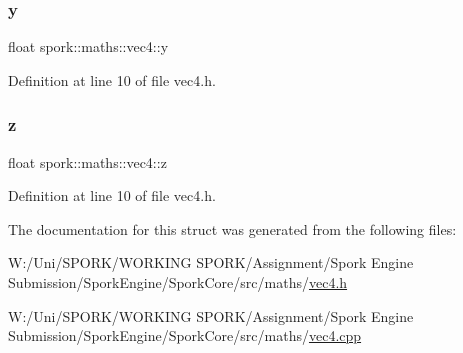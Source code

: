 \subsubsection{\texorpdfstring{y}{y}}
{\footnotesize\ttfamily float spork\+::maths\+::vec4\+::y}



Definition at line 10 of file vec4.\+h.

\mbox{\label{structspork_1_1maths_1_1vec4_ab9786e1d7ec46d476a97d29330d568fe}} 
\subsubsection{\texorpdfstring{z}{z}}
{\footnotesize\ttfamily float spork\+::maths\+::vec4\+::z}



Definition at line 10 of file vec4.\+h.



The documentation for this struct was generated from the following files\+:\begin{DoxyCompactItemize}
\item 
W\+:/\+Uni/\+S\+P\+O\+R\+K/\+W\+O\+R\+K\+I\+N\+G S\+P\+O\+R\+K/\+Assignment/\+Spork Engine Submission/\+Spork\+Engine/\+Spork\+Core/src/maths/\hyperlink{vec4_8h}{vec4.\+h}\item 
W\+:/\+Uni/\+S\+P\+O\+R\+K/\+W\+O\+R\+K\+I\+N\+G S\+P\+O\+R\+K/\+Assignment/\+Spork Engine Submission/\+Spork\+Engine/\+Spork\+Core/src/maths/\hyperlink{vec4_8cpp}{vec4.\+cpp}\end{DoxyCompactItemize}
